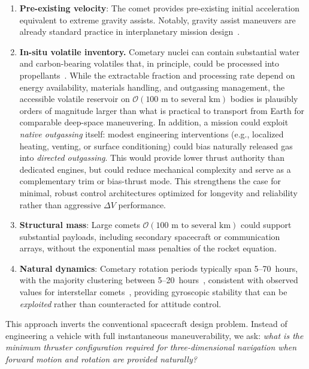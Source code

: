 \documentclass{article}
\begin{document}
\begin{enumerate}
    \item \textbf{Pre-existing velocity}: The comet provides pre-existing initial acceleration equivalent to extreme gravity assists. Notably, gravity assist maneuvers are already standard practice in interplanetary mission design~\cite{wertz1999spacecraft,bolton2017jupiter}.
    
    \item \textbf{In-situ volatile inventory.} Cometary nuclei can contain substantial water and carbon-bearing volatiles that, in principle, could be processed into propellants~\cite{mumma2011composition}. While the extractable fraction and processing rate depend on energy availability, materials handling, and outgassing management, the accessible volatile reservoir on $\mathcal{O}(100\text{ m to }\text{several km})$ bodies is plausibly orders of magnitude larger than what is practical to transport from Earth for comparable deep-space maneuvering. In addition, a mission could exploit \emph{native outgassing} itself: modest engineering
    interventions (e.g., localized heating, venting, or surface conditioning) could bias naturally released gas into \emph{directed outgassing}. This would provide lower thrust authority than dedicated engines, but could reduce mechanical complexity and serve as a complementary trim or bias-thrust mode. This strengthens the case for minimal, robust control architectures optimized for longevity and reliability rather than aggressive $\Delta V$ performance.
    
    \item \textbf{Structural mass}: Large comets $\mathcal{O}(100\text{ m to }\text{several km})$ could support substantial payloads, including secondary spacecraft or communication arrays, without the exponential mass penalties of the rocket equation.
    
\item \textbf{Natural dynamics}: Cometary rotation periods typically span 5--70~hours, with the majority clustering between 5--20~hours~\cite{Kokotanekova2017Rotation}, consistent with observed values for interstellar comets~\cite{delaFuenteMarcos2025gtc,scarmato2026rotation}, providing gyroscopic stability that can be \textit{exploited} rather than counteracted for attitude control.

\end{enumerate}

This approach inverts the conventional spacecraft design problem. Instead of engineering a vehicle with full instantaneous maneuverability, we ask: \textit{what is the minimum thruster configuration required for three-dimensional navigation when forward motion and rotation are provided naturally?}
\end{document}
